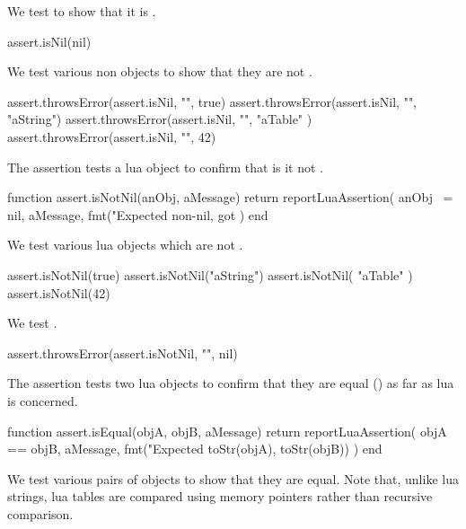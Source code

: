 
We test  to show that it is . 

\startLuaTest
  assert.isNil(nil)
\stopLuaTest
\stopTestCase


We test various non  objects to show that they are not 
. 

\startLuaTest
  assert.throwsError(assert.isNil, "", true)
  assert.throwsError(assert.isNil, "", "aString")
  assert.throwsError(assert.isNil, "", { "aTable" })
  assert.throwsError(assert.isNil, "", 42)
\stopLuaTest
\stopTestCase

\stopTestSuite


The  assertion tests a lua object to confirm that is 
it not . 

\startLuaCode
function assert.isNotNil(anObj, aMessage)
  return reportLuaAssertion(
    anObj ~= nil,
    aMessage,
    fmt("Expected non-nil, got %
  )
end
\stopLuaCode


We test various lua objects which are not .

\startLuaTest
  assert.isNotNil(true)
  assert.isNotNil("aString")
  assert.isNotNil({ "aTable" })
  assert.isNotNil(42)
\stopLuaTest
\stopTestCase


We test .

\startLuaTest
  assert.throwsError(assert.isNotNil, "", nil)
\stopLuaTest
\stopTestSuite


The  assertion tests two lua objects to confirm that 
they are equal (\type{==}) as far as lua is concerned. 

\startLuaCode
function assert.isEqual(objA, objB, aMessage)
  return reportLuaAssertion(
    objA == objB,
    aMessage,
    fmt("Expected %
      toStr(objA), toStr(objB))
  )
end
\stopLuaCode


We test various pairs of objects to show that they are equal. Note that, 
unlike lua strings, lua tables are compared using memory pointers rather 
than recursive comparison. 

